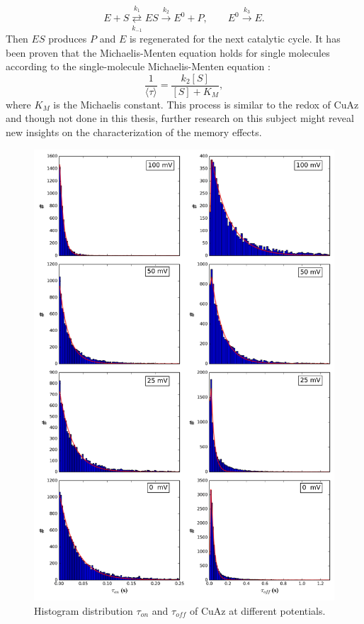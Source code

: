 \documentclass[twoside,single]{lion-msc}
\begin{document}
\begin{equation}\label{MMmech}
E + S \overset{k_{1}}{\underset{k_{-1}}\rightleftarrows} ES \overset{k_{2}}\rightarrow E^{0} + P,  \qquad E^{0} \overset{k_{3}}\rightarrow E.
\end{equation}
Then $ES$ produces $P$ and $E$ is regenerated for the next catalytic cycle. It has been proven that the Michaelis-Menten equation holds for single molecules according to the single-molecule Michaelis-Menten equation \cite{English2006}:
\begin{equation}\label{MMmech}
\frac{1}{\langle \tau \rangle} = \frac{k_{2}[S]}{[S]+K_{M}},
\end{equation}
 where $K_{M}$ is the Michaelis constant. This process is similar to the redox of CuAz and though not done in this thesis, further research on this subject might reveal new insights on the characterization of the memory effects. 

\begin{figure}[ht!]
\centering
\includegraphics[width=.9\textwidth]{histograms_thesis}
\caption{Histogram distribution $\tau_{on}$ and $\tau_{off}$ of CuAz at different potentials.}
\label{histograms_disc}
\end{figure}
\end{document}
